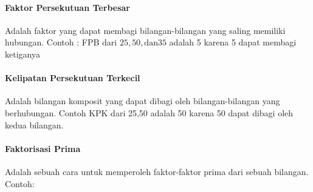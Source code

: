 \paragraph{Faktor Persekutuan Terbesar}
	Adalah faktor yang dapat membagi bilangan-bilangan yang saling memiliki hubungan. Contoh : FPB dari $25,50,\text{dan} 35$ adalah 5 karena 5 dapat membagi ketiganya
\paragraph{Kelipatan Persekutuan Terkecil}
	Adalah bilangan komposit yang dapat dibagi oleh bilangan-bilangan yang berhubungan. Contoh KPK dari 25,50 adalah 50 karena 50 dapat dibagi oleh kedua bilangan.
\paragraph{Faktorisasi Prima} Adalah sebuah cara untuk memperoleh faktor-faktor prima dari sebuah bilangan. Contoh:\\
	